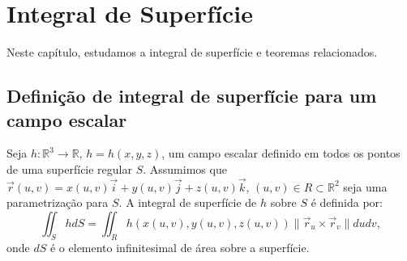 \chapter{Integral de Superfície}
  Neste capítulo, estudamos a integral de superfície e teoremas relacionados.
\section{Definição de integral de superfície para um campo escalar}

Seja $h: \mathbb{R}^3\to \mathbb{R}$, $h= h(x,y,z)$, um campo escalar definido em todos os pontos de uma superfície regular $S$. Assumimos que $\vec{r}(u,v)=x(u,v)\vec{i}+y(u,v)\vec{j}+z(u,v)\vec{k}$, $(u,v)\in R \subset \mathbb{R}^2$ seja uma parametrização para $S$. A integral de superfície de $h$ sobre $S$ é definida por:
\begin{equation}\label{definicao_int_sup_esc}
\iint_S h d S = \iint_R h(x(u,v),y(u,v),z(u,v)) \|\vec{r}_u\times \vec{r}_v\|d udv, 
\end{equation}
onde $dS$ é o elemento infinitesimal de área sobre a superfície.


